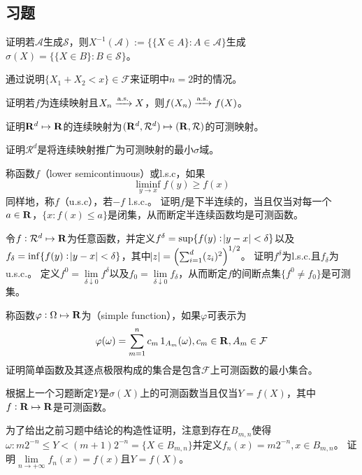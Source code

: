 \documentclass[../main.tex]{subfiles}
\begin{document}
\subsection*{习题}
\begin{exercise}
	\item 证明若\(\mathcal{A}\)生成\(\mathcal{S}\)，则\(X^{-1}(\mathcal{A}):=\{\{X\in A\}:A\in\mathcal{A}\}\)生成\(\sigma(X)=\{\{X\in B\}:B\in\mathcal{S}\}\)。
	\item 通过说明\(\{X_1+X_2<x\}\in\mathcal{F}\)来证明中\(n=2\)时的情况。
	\item 证明若\(f\)为连续映射且\(X_n\xrightarrow{\text{a.s.}}X\)，则\(f(X_n)\xrightarrow{\text{a.s.}}f(X)\)。
	\item \begin{exercise}
		\item 证明\(\mathbf{R}^d\mapsto\mathbf{R}\)的连续映射为\((\mathbf{R}^d,\mathcal{R}^d)\mapsto(\mathbf{R},\mathcal{R})\)的可测映射。
		\item 证明\(\mathcal{R}^d\)是将连续映射推广为可测映射的最小\(\sigma\)域。
	\end{exercise}
	\item 称函数\(f\)（lower semicontinuous）或l.s.c，如果
	\[\liminf_{y\rightarrow x}f(y)\geq f(x)\]
	同样地，称\(f\)（u.s.c），若\(-f\) l.s.c.。
	证明\(f\)是下半连续的，当且仅当对每一个\(a\in\mathbf{R}\)，\(\{x:f(x)\leq a\}\)是闭集，从而断定半连续函数均是可测函数。
	\item 令\(f:\mathcal{R}^d\mapsto\mathbf{R}\)为任意函数，并定义\(f^\delta=\sup\{f(y):\envert{y-x}<\delta\}\)以及\(f_\delta=\inf\{f(y):\envert{y-x}<\delta\}\)，其中\(\envert{z}=\del{\sum_{i=1}^d(z_i)^2}^{1/2}\)。
	证明\(f^\delta\)为l.s.c.且\(f_\delta\)为u.s.c.。
	定义\(f^0=\lim\limits_{\delta\downarrow0}f^\delta\)以及\(f_0=\lim\limits_{\delta\downarrow0}f_\delta\)，从而断定\(f\)的间断点集\(\{f^0\neq f_0\}\)是可测集。
	\item 称函数\(\varphi: \Omega\mapsto\mathbf{R}\)为（simple function），如果\(\varphi\)可表示为
	\[\varphi(\omega)=\sum_{m=1}^nc_m\operatorname{1}_{A_m}(\omega), c_m\in\mathbf{R}, A_m\in\mathcal{F}\]
	证明简单函数及其逐点极限构成的集合是包含\(\mathcal{F}\)上可测函数的最小集合。
	\item 根据上一个习题断定\(Y\)是\(\sigma(X)\)上的可测函数当且仅当\(Y=f(X)\)，其中\(f:\mathbf{R}\mapsto\mathbf{R}\)是可测函数。
	\item 为了给出之前习题中结论的构造性证明，注意到存在\(B_{m,n}\)使得\(\omega:m2^{-n}\leq Y<(m+1)2^{-n}=\{X\in B_{m,n}\}\)并定义\(f_n(x)=m2^{-n}, x\in B_{m,n}\)。
	证明\(\lim\limits_{n\rightarrow+\infty}f_n(x)=f(x)\)且\(Y=f(X)\)。
\end{exercise}
\end{document}
